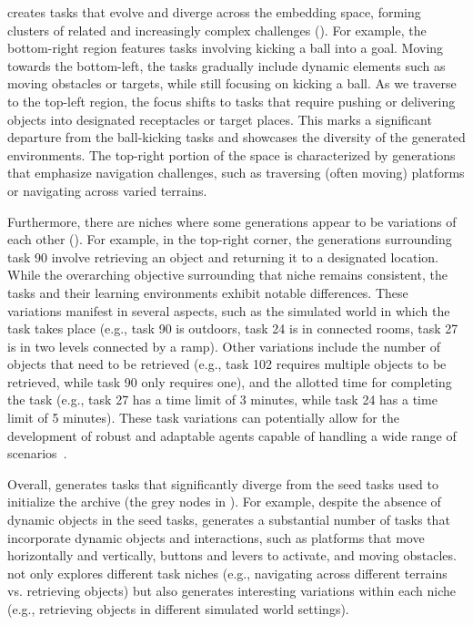 \documentclass{article} %
\begin{document}
\ours{} creates tasks that evolve and diverge across the embedding space, forming clusters of related and increasingly complex challenges (). For example, the bottom-right region features tasks involving kicking a ball into a goal. Moving towards the bottom-left, the tasks gradually include dynamic elements such as moving obstacles or targets, while still focusing on kicking a ball. As we traverse to the top-left region, the focus shifts to tasks that require pushing or delivering objects into designated receptacles or target places. This marks a significant departure from the ball-kicking tasks and showcases the diversity of the generated environments. The top-right portion of the space is characterized by generations that emphasize navigation challenges, such as traversing (often moving) platforms or navigating across varied terrains.

Furthermore, there are niches where some generations appear to be variations of each other (). For example, in the top-right corner, the generations surrounding task 90 involve retrieving an object and returning it to a designated location. While the overarching objective surrounding that niche remains consistent, the tasks and their learning environments exhibit notable differences. These variations manifest in several aspects, such as the simulated world in which the task takes place (e.g., task 90 is outdoors, task 24 is in connected rooms, task 27 is in two levels connected by a ramp). Other variations include the number of objects that need to be retrieved (e.g., task 102 requires multiple objects to be retrieved, while task 90 only requires one), and the allotted time for completing the task (e.g., task 27 has a time limit of 3 minutes, while task 24 has a time limit of 5 minutes). These task variations can potentially allow for the development of robust and adaptable agents capable of handling a wide range of scenarios~\citep{bauer_HumanTimescaleAdaptationOpenEnded_2023}.

Overall, \ours{} generates tasks that significantly diverge from the seed tasks used to initialize the archive (the grey nodes in ). For example, despite the absence of dynamic objects in the seed tasks, \ours{} generates a substantial number of tasks that incorporate dynamic objects and interactions, such as platforms that move horizontally and vertically, buttons and levers to activate, and moving obstacles. \ours{} not only explores different task niches (e.g., navigating across different terrains vs. retrieving objects) but also generates interesting variations within each niche (e.g., retrieving objects in different simulated world settings).
\end{document}
